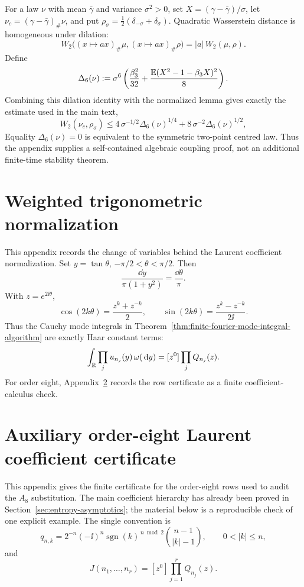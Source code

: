 For a law \(\nu\) with mean \(\bar\gamma\) and variance \(\sigma^2>0\), set
\(X=(\gamma-\bar\gamma)/\sigma\), let
\(\nu_c=(\gamma-\bar\gamma)_\#\nu\), and put
\(\rho_\sigma=\frac12(\delta_{-\sigma}+\delta_\sigma)\).  Quadratic
Wasserstein distance is homogeneous under dilation:
\[
W_2\bigl((x\mapsto ax)_\#\mu,(x\mapsto ax)_\#\rho\bigr)
=|a|\,W_2(\mu,\rho).
\]
Define
\[
\Delta_6(\nu)
:=\sigma^6\left(
\frac{\beta_3^2}{32}+\frac{\mathbb{E}(X^2-1-\beta_3X)^2}{8}
\right).
\]
Combining this dilation identity with the normalized lemma gives exactly the
estimate used in the main text,
\[
W_2(\nu_c,\rho_\sigma)
\le
4\,\sigma^{-1/2}\Delta_6(\nu)^{1/4}
+8\,\sigma^{-2}\Delta_6(\nu)^{1/2},
\]
Equality \(\Delta_6(\nu)=0\) is equivalent to the symmetric two-point centred
law.  Thus the appendix supplies a self-contained algebraic coupling proof,
not an additional finite-time stability theorem.

\section{Weighted trigonometric normalization}%
\label{app:entropy-integrals}
\label{app:background-symbol-criterion}

This appendix records the change of variables behind the Laurent coefficient
normalization.  Set \(y=\tan\theta\),
\(-\pi/2<\theta<\pi/2\).  Then
\[
  \frac{\dd y}{\pi(1+y^2)}=\frac{\dd\theta}{\pi}.
\]
With \(z=e^{2\ii\theta}\),
\[
  \cos(2k\theta)=\frac{z^k+z^{-k}}2,\qquad
  \sin(2k\theta)=\frac{z^k-z^{-k}}{2\ii}.
\]
Thus the Cauchy mode integrals in
Theorem~\ref{thm:finite-fourier-mode-integral-algorithm} are exactly Haar
constant terms:
\[
  \int_{\mathbb{R}}\prod_j u_{n_j}(y)\,\omega(\,\mathrm{d} y)
  =[z^0]\prod_j Q_{n_j}(z).
\]
For order eight, Appendix~\ref{app:order-eight-laurent-certificate} records
the row certificate as a finite coefficient-calculus check.

\section{Auxiliary order-eight Laurent coefficient certificate}%
\label{app:order-eight-laurent-certificate}

This appendix gives the finite certificate for the order-eight rows used to
audit the \(A_8\) substitution.  The main coefficient hierarchy has already
been proved in Section~\ref{sec:entropy-asymptotics}; the material below is
a reproducible check of one explicit example.  The single convention is
\[
q_{n,k}=2^{-n}(-\ii)^n
\operatorname{sgn}(k)^{\,n\bmod2}
\binom{n-1}{|k|-1},
\qquad 0<|k|\le n,
\]
and
\[
J(n_1,\ldots,n_r)=[z^0]\prod_{j=1}^rQ_{n_j}(z).
\]

